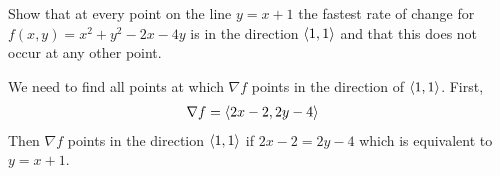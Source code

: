 \documentclass[12pt]{exam}
\begin{document}
\begin{questions}
\question Show that at every point on the line \(y=x+1\) the fastest rate of change for \(f(x,y)=x^2+y^2-2x-4y\) is in the direction \(\left\langle 1,1 \right\rangle\) and that this does not occur at any other point.
        \ifprintanswers
        \begin{solution}
        We need to find all points at which \(\nabla f\) points in the direction of \(\left\langle 1,1 \right\rangle\). First,
            \begin{align*}
                \nabla f & = \left\langle 2x-2,2y-4 \right\rangle
            \end{align*}
            Then \(\nabla f\) points in the direction \(\left\langle 1,1 \right\rangle\) if \(2x-2=2y-4\) which is equivalent to \(y=x+1\).
        \end{solution}
    \else
        \vfill
    \fi

\end{questions}
\end{document}
